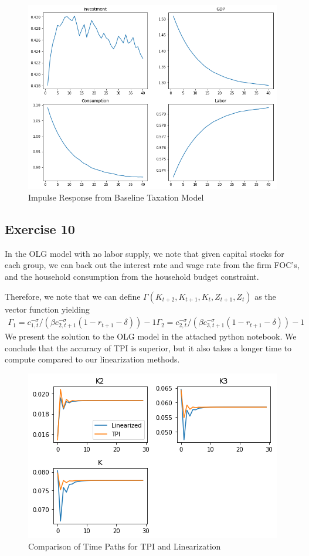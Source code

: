 \documentclass{article}
\begin{document}
    \begin{figure}[!h]
    	\centering
    	\caption{Impulse Response from Baseline Taxation Model}
    	\includegraphics[scale = 0.5]{fig6}
    \end{figure}
    
    \subsection*{Exercise 10}
    In the OLG model with no labor supply, we note that given capital stocks for each group, we can back out the interest rate and wage rate from the firm FOC's, and the household consumption from the household budget constraint. 
    
    Therefore, we note that we can define $\Gamma(K_{t+2}, K_{t+1}, K_t, Z_{t+1}, Z_t)$ as the vector function yielding
    \begin{align*}
    \Gamma_1 = c_{1,t}^{-\sigma} /(\beta c_{2,t+1}^{-\sigma} (1 - r_{t+1} - \delta)) - 1
    \Gamma_2 = c_{2,t}^{-\sigma} /(\beta c_{3,t+1}^{-\sigma} (1 - r_{t+1} - \delta)) - 1
    \end{align*}
    We present the solution to the OLG model in the attached python notebook. We conclude that the accuracy of TPI is superior, but it also takes a longer time to compute compared to our linearization methods. 
    
    \begin{figure}[!h]
    	\centering
    	\caption{Comparison of Time Paths for TPI and Linearization}
    	\includegraphics[scale = 0.5]{fig7}
    \end{figure}
    
\end{document}
